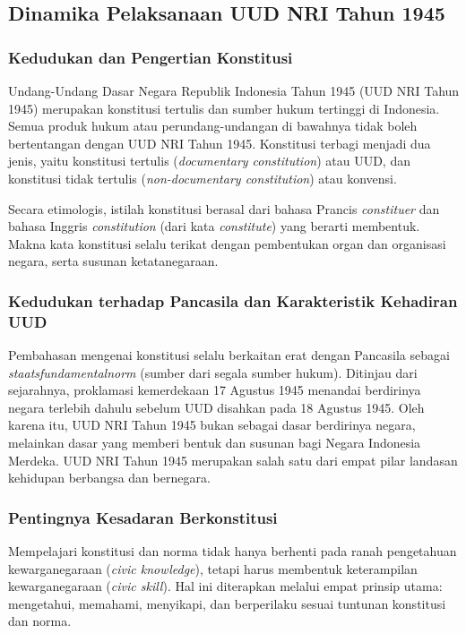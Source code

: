 \subsection{Dinamika Pelaksanaan UUD NRI Tahun 1945}
\subsubsection{Kedudukan dan Pengertian Konstitusi}
Undang-Undang Dasar Negara Republik Indonesia Tahun 1945 (UUD NRI Tahun 1945) merupakan konstitusi tertulis dan sumber hukum tertinggi di Indonesia. Semua produk hukum atau perundang-undangan di bawahnya tidak boleh bertentangan dengan UUD NRI Tahun 1945. Konstitusi terbagi menjadi dua jenis, yaitu konstitusi tertulis (\textit{documentary constitution}) atau UUD, dan konstitusi tidak tertulis (\textit{non-documentary constitution}) atau konvensi.

Secara etimologis, istilah konstitusi berasal dari bahasa Prancis \textit{constituer} dan bahasa Inggris \textit{constitution} (dari kata \textit{constitute}) yang berarti membentuk. Makna kata konstitusi selalu terikat dengan pembentukan organ dan organisasi negara, serta susunan ketatanegaraan.

\subsubsection{Kedudukan terhadap Pancasila dan Karakteristik Kehadiran UUD}
Pembahasan mengenai konstitusi selalu berkaitan erat dengan Pancasila sebagai \textit{staatsfundamentalnorm} (sumber dari segala sumber hukum). Ditinjau dari sejarahnya, proklamasi kemerdekaan 17 Agustus 1945 menandai berdirinya negara terlebih dahulu sebelum UUD disahkan pada 18 Agustus 1945. Oleh karena itu, UUD NRI Tahun 1945 bukan sebagai dasar berdirinya negara, melainkan dasar yang memberi bentuk dan susunan bagi Negara Indonesia Merdeka. UUD NRI Tahun 1945 merupakan salah satu dari empat pilar landasan kehidupan berbangsa dan bernegara.

\subsubsection{Pentingnya Kesadaran Berkonstitusi}
Mempelajari konstitusi dan norma tidak hanya berhenti pada ranah pengetahuan kewarganegaraan (\textit{civic knowledge}), tetapi harus membentuk keterampilan kewarganegaraan (\textit{civic skill}). Hal ini diterapkan melalui empat prinsip utama: mengetahui, memahami, menyikapi, dan berperilaku sesuai tuntunan konstitusi dan norma.

